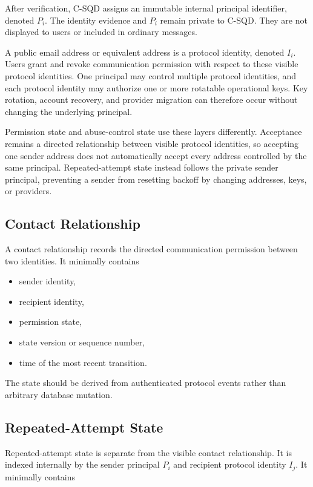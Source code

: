 \documentclass[11pt]{article}
\begin{document}
After verification, C-SQD assigns an immutable internal principal identifier, denoted $P_i$. The identity evidence and $P_i$ remain private to C-SQD. They are not displayed to users or included in ordinary messages.

A public email address or equivalent address is a protocol identity, denoted $I_i$. Users grant and revoke communication permission with respect to these visible protocol identities. One principal may control multiple protocol identities, and each protocol identity may authorize one or more rotatable operational keys. Key rotation, account recovery, and provider migration can therefore occur without changing the underlying principal.

Permission state and abuse-control state use these layers differently. Acceptance remains a directed relationship between visible protocol identities, so accepting one sender address does not automatically accept every address controlled by the same principal. Repeated-attempt state instead follows the private sender principal, preventing a sender from resetting backoff by changing addresses, keys, or providers.

\subsection{Contact Relationship}

A contact relationship records the directed communication permission between two identities. It minimally contains

\begin{itemize}[leftmargin=2em]
    \item sender identity,
    \item recipient identity,
    \item permission state,
    \item state version or sequence number,
    \item time of the most recent transition.
\end{itemize}

The state should be derived from authenticated protocol events rather than arbitrary database mutation.

\subsection{Repeated-Attempt State}

Repeated-attempt state is separate from the visible contact relationship. It is indexed internally by the sender principal $P_i$ and recipient protocol identity $I_j$. It minimally contains
\end{document}
